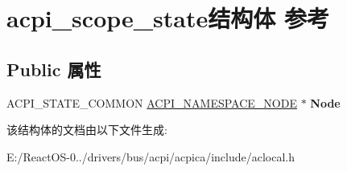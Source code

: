 \hypertarget{structacpi__scope__state}{}\section{acpi\+\_\+scope\+\_\+state结构体 参考}
\label{structacpi__scope__state}
\subsection*{Public 属性}
\begin{DoxyCompactItemize}
\item 
\mbox{\label{structacpi__scope__state_abb023093cf3e59c5338c7c6de304724f}} 
A\+C\+P\+I\+\_\+\+S\+T\+A\+T\+E\+\_\+\+C\+O\+M\+M\+ON \hyperlink{structacpi__namespace__node}{A\+C\+P\+I\+\_\+\+N\+A\+M\+E\+S\+P\+A\+C\+E\+\_\+\+N\+O\+DE} $\ast$ {\bfseries Node}
\end{DoxyCompactItemize}


该结构体的文档由以下文件生成\+:\begin{DoxyCompactItemize}
\item 
E\+:/\+React\+O\+S-\/0../drivers/bus/acpi/acpica/include/aclocal.\+h\end{DoxyCompactItemize}
